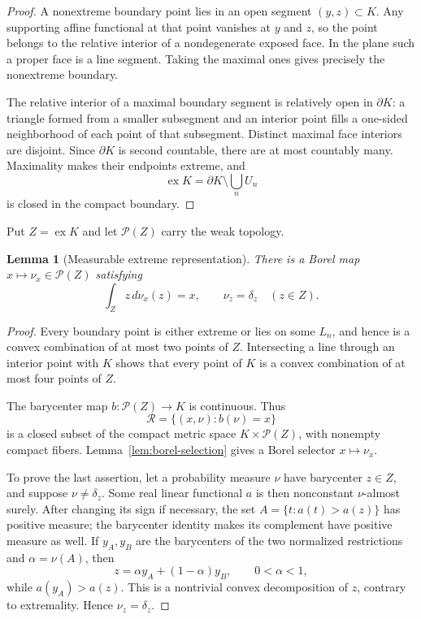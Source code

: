 \documentclass[11pt,a4paper]{amsart}
\newtheorem{lemma}[theorem]{Lemma}
\theoremstyle{remark}
\newcommand{\ex}{\operatorname{ex}}
\begin{document}
\begin{proof}
A nonextreme boundary point lies in an open segment \((y,z)\subset K\).
Any supporting affine functional at that point vanishes at \(y\) and \(z\),
so the point belongs to the relative interior of a nondegenerate exposed
face.  In the plane such a proper face is a line segment.  Taking the maximal
ones gives precisely the nonextreme boundary.

The relative interior of a maximal boundary segment is relatively open in
\(\partial K\): a triangle formed from a smaller subsegment and an interior
point fills a one-sided neighborhood of each point of that subsegment.
Distinct maximal face interiors are disjoint.  Since \(\partial K\) is
second countable, there are at most countably many.  Maximality makes their
endpoints extreme, and
\[
 \ex K=\partial K\setminus\bigcup_nU_n
\]
is closed in the compact boundary.
\end{proof}

Put \(Z=\ex K\) and let \(\mathcal P(Z)\) carry the weak topology.

\begin{lemma}[Measurable extreme representation]\label{lem:kernel}
There is a Borel map \(x\mapsto\nu_x\in\mathcal P(Z)\) satisfying
\[
 \int_Zz\,d\nu_x(z)=x,\qquad
 \nu_z=\delta_z\quad(z\in Z).                \tag{3.2}
\]
\end{lemma}

\begin{proof}
Every boundary point is either extreme or lies on some \(L_n\), and hence is
a convex combination of at most two points of \(Z\).  Intersecting a line
through an interior point with \(K\) shows that every point of \(K\) is a
convex combination of at most four points of \(Z\).

The barycenter map \(b\colon\mathcal P(Z)\to K\) is continuous.  Thus
\[
 \mathcal R=\{(x,\nu):b(\nu)=x\}
\]
is a closed subset of the compact metric space
\(K\times\mathcal P(Z)\), with nonempty compact fibers.
Lemma~\ref{lem:borel-selection} gives a Borel selector
\(x\mapsto\nu_x\).

To prove the last assertion, let a probability measure \(\nu\) have
barycenter \(z\in Z\), and suppose \(\nu\neq\delta_z\).  Some real linear
functional \(a\) is then nonconstant \(\nu\)-almost surely.  After changing
its sign if necessary, the set \(A=\{t:a(t)>a(z)\}\) has positive measure;
the barycenter identity makes its complement have positive measure as well.
If \(y_A,y_B\) are the barycenters of the two normalized restrictions and
\(\alpha=\nu(A)\), then
\[
 z=\alpha y_A+(1-\alpha)y_B,\qquad 0<\alpha<1,
\]
while \(a(y_A)>a(z)\).  This is a nontrivial convex decomposition of \(z\),
contrary to extremality.  Hence \(\nu_z=\delta_z\).
\end{proof}
\end{document}
